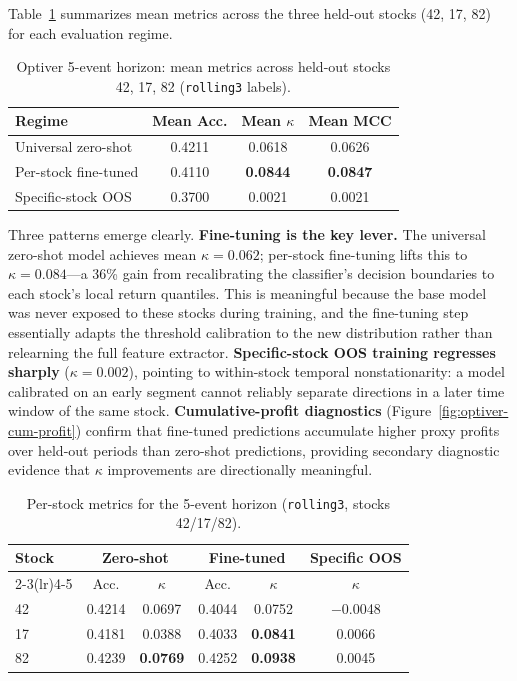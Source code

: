 \documentclass[11pt]{article}
\begin{document}
Table~\ref{tab:optiver-main} summarizes mean metrics across the three held-out stocks (42, 17, 82) for each evaluation regime.

\begin{table}[H]
\centering
\caption{Optiver 5-event horizon: mean metrics across held-out stocks 42, 17, 82 (\texttt{rolling3} labels).}
\label{tab:optiver-main}
\begin{tabular}{lccc}
\toprule
Regime & Mean Acc. & Mean $\kappa$ & Mean MCC \\
\midrule
Universal zero-shot & 0.4211 & 0.0618 & 0.0626 \\
Per-stock fine-tuned & 0.4110 & \textbf{0.0844} & \textbf{0.0847} \\
Specific-stock OOS  & 0.3700 & 0.0021 & 0.0021 \\
\bottomrule
\end{tabular}
\end{table}

Three patterns emerge clearly. \textbf{Fine-tuning is the key lever.} The universal zero-shot model achieves mean $\kappa{=}0.062$; per-stock fine-tuning lifts this to $\kappa{=}0.084$---a 36\% gain from recalibrating the classifier's decision boundaries to each stock's local return quantiles. This is meaningful because the base model was never exposed to these stocks during training, and the fine-tuning step essentially adapts the threshold calibration to the new distribution rather than relearning the full feature extractor. \textbf{Specific-stock OOS training regresses sharply} ($\kappa{=}0.002$), pointing to within-stock temporal nonstationarity: a model calibrated on an early segment cannot reliably separate directions in a later time window of the same stock. \textbf{Cumulative-profit diagnostics} (Figure~\ref{fig:optiver-cum-profit}) confirm that fine-tuned predictions accumulate higher proxy profits over held-out periods than zero-shot predictions, providing secondary diagnostic evidence that $\kappa$ improvements are directionally meaningful.

\begin{table}[H]
\centering
\caption{Per-stock metrics for the 5-event horizon (\texttt{rolling3}, stocks 42/17/82).}
\label{tab:optiver-per-stock}
\begin{tabular}{lccccc}
\toprule
Stock & \multicolumn{2}{c}{Zero-shot} & \multicolumn{2}{c}{Fine-tuned} & Specific OOS \\
\cmidrule(lr){2-3}\cmidrule(lr){4-5}
 & Acc. & $\kappa$ & Acc. & $\kappa$ & $\kappa$ \\
\midrule
42 & 0.4214 & 0.0697 & 0.4044 & 0.0752 & $-$0.0048 \\
17 & 0.4181 & 0.0388 & 0.4033 & \textbf{0.0841} & 0.0066 \\
82 & 0.4239 & \textbf{0.0769} & 0.4252 & \textbf{0.0938} & 0.0045 \\
\bottomrule
\end{tabular}
\end{table}
\end{document}
